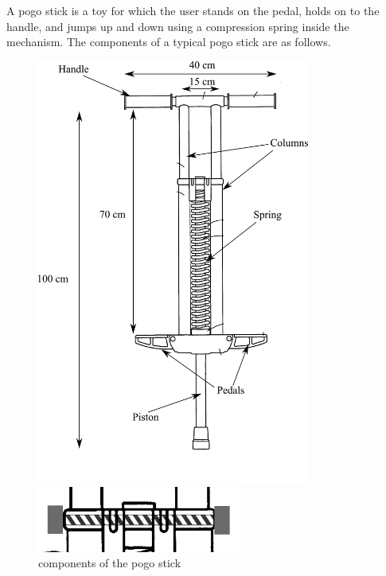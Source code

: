 \documentclass[
10pt,
a4paper,
openany,
svgnames,
]{book}
\newcommand{\exercise}{%
\item \label{lab:\arabic{chapter}-\arabic{exercisesi}}  %
}
\begin{document}
\begin{exercises}
  \exercise A pogo stick is a toy for which the user stands on the pedal, holds on
  to the handle, and jumps up and down using a compression spring inside
  the mechanism. The components of a typical pogo stick are as follows.
  
  \begin{figure}[H]
    \begin{minipage}[b]{0.6\textwidth}
      \centering
      \includegraphics[width=0.8\textwidth]{pictures/Machine-interaction/pogostick}
      \caption{components of the pogo stick}
      \label{fig1}
    \end{minipage}
    \hfill
    \begin{minipage}[b]{0.4\textwidth}
      \centering
      \includegraphics[width=0.6\textwidth]{pictures/Machine-interaction/pogostick-bolt}

\end{minipage}
\end{figure}
\end{exercises}
\end{document}
